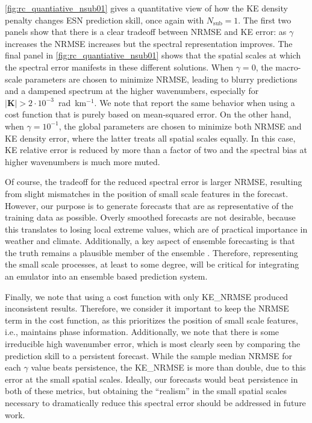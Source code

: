 \documentclass[draft]{agujournal2019}
\newcommand{\nsub}{N_\text{sub}}
\newcommand{\citep}{\cite}
\newcommand{\citet}{\citeA}
\begin{document}
\cref{fig:rc_quantiative_nsub01} gives a quantitative view of how the KE density
penalty changes ESN prediction skill, once again with $\nsub=1$.
The first two panels show that there is a clear tradeoff between NRMSE and KE error:
as $\gamma$ increases the NRMSE increases but the spectral representation improves.
The final panel in \cref{fig:rc_quantiative_nsub01}
shows that the spatial scales at which the spectral error manifests in these
different solutions.
When $\gamma=0$, the macro-scale parameters are chosen to minimize NRMSE,
leading to blurry predictions and a dampened spectrum at the higher wavenumbers,
especially for $|\mathbf{K}| > 2\cdot10^{-3}$~rad~km$^{-1}$.
We note that \citet{lam_graphcast_2022} report the same behavior when using a cost function that is purely based on mean-squared error.
On the other hand, when $\gamma = 10^{-1}$, the global parameters are chosen to
minimize both NRMSE and KE density error, where the latter treats all spatial
scales equally.
In this case, KE relative error is reduced by more than a factor of two and the
spectral bias at higher wavenumbers is much more muted.


Of course, the tradeoff for the reduced spectral error is larger NRMSE, resulting
from slight mismatches in the position of small scale features in the forecast.
However, our purpose is to generate forecasts that are as representative
of the training data as possible.
Overly smoothed forecasts are not desirable, because this translates to losing local extreme values,
which are of practical importance in weather and climate.
Additionally, a key aspect of ensemble forecasting is that the truth remains a
plausible member of the ensemble \citep{kalnay_ensemble_2006}.
Therefore, representing the small scale processes, at least to some degree,
will be critical for integrating an
emulator into an ensemble based prediction system.

Finally, we note that using a cost function with only KE\_NRMSE produced inconsistent
results.
Therefore, we consider it important to keep the NRMSE term in the
cost function, as this prioritizes the position of small scale features, i.e.,
maintains phase information.
Additionally, we note that there is some irreducible high wavenumber error,
which is most clearly seen by comparing the prediction skill to a persistent
forecast.
While the sample median NRMSE for each $\gamma$ value beats persistence, the
KE\_NRMSE is more than double, due to this error at the small spatial scales.
Ideally, our forecasts would beat persistence in both of these metrics, but
obtaining the ``realism'' in the small spatial scales necessary to
dramatically reduce this spectral error should be addressed in future work.
\end{document}
